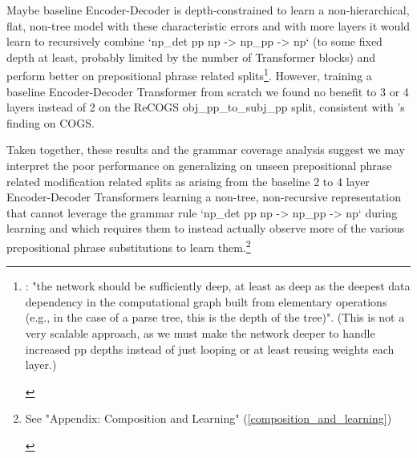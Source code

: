\documentclass[11pt]{article}
\begin{document}
Maybe \citep{Wu2023} baseline Encoder-Decoder is depth-constrained to learn a non-hierarchical, flat, non-tree model with these characteristic errors and with more layers it would learn to recursively combine `np\_det pp np -> np\_pp -> np` (to some fixed depth at least, probably limited by the number of Transformer blocks) and perform better on prepositional phrase related splits\footnote{\begin{footnotesize}\citep{Csordas2022}: "the network should be sufficiently deep, at least as deep as the deepest data dependency in the computational graph built from elementary operations (e.g., in the case of a parse tree, this is the depth of the tree)". (This is not a very scalable approach, as we must make the network deeper to handle increased pp depths instead of just looping or at least reusing weights each layer.)\end{footnotesize}}. However, training a \citep{Wu2023} baseline Encoder-Decoder Transformer from scratch we found no benefit to 3 or 4 layers instead of 2 on the ReCOGS obj\_pp\_to\_subj\_pp split, consistent with \citep{petty2024impactdepthcompositionalgeneralization}'s finding on COGS.

Taken together, these results and the grammar coverage analysis suggest we may interpret the poor performance on generalizing on unseen prepositional phrase related modification related splits as arising from the baseline 2 to 4 layer Encoder-Decoder Transformers learning a non-tree, non-recursive representation that cannot leverage the grammar rule `np\_det pp np -> np\_pp -> np` during learning and which requires them to instead actually observe more of the various prepositional phrase substitutions to learn them.\footnote{\begin{footnotesize}See "Appendix: Composition and Learning" (\ref{composition_and_learning})\end{footnotesize}}
\end{document}
